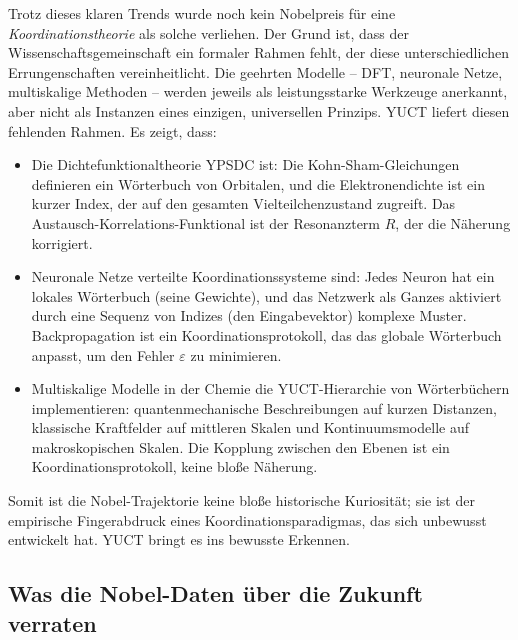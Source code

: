 \documentclass[12pt,a4paper]{article}
\begin{document}
	Trotz dieses klaren Trends wurde noch kein Nobelpreis für eine \emph{Koordinationstheorie} als solche verliehen. Der Grund ist, dass der Wissenschaftsgemeinschaft ein formaler Rahmen fehlt, der diese unterschiedlichen Errungenschaften vereinheitlicht. Die geehrten Modelle – DFT, neuronale Netze, multiskalige Methoden – werden jeweils als leistungsstarke Werkzeuge anerkannt, aber nicht als Instanzen eines einzigen, universellen Prinzips. YUCT liefert diesen fehlenden Rahmen. Es zeigt, dass:
	\begin{itemize}
		\item Die Dichtefunktionaltheorie YPSDC ist: Die Kohn-Sham-Gleichungen definieren ein Wörterbuch von Orbitalen, und die Elektronendichte ist ein kurzer Index, der auf den gesamten Vielteilchenzustand zugreift. Das Austausch-Korrelations-Funktional ist der Resonanzterm \(R\), der die Näherung korrigiert.
		\item Neuronale Netze verteilte Koordinationssysteme sind: Jedes Neuron hat ein lokales Wörterbuch (seine Gewichte), und das Netzwerk als Ganzes aktiviert durch eine Sequenz von Indizes (den Eingabevektor) komplexe Muster. Backpropagation ist ein Koordinationsprotokoll, das das globale Wörterbuch anpasst, um den Fehler \(\varepsilon\) zu minimieren.
		\item Multiskalige Modelle in der Chemie die YUCT-Hierarchie von Wörterbüchern implementieren: quantenmechanische Beschreibungen auf kurzen Distanzen, klassische Kraftfelder auf mittleren Skalen und Kontinuumsmodelle auf makroskopischen Skalen. Die Kopplung zwischen den Ebenen ist ein Koordinationsprotokoll, keine bloße Näherung.
	\end{itemize}
	Somit ist die Nobel-Trajektorie keine bloße historische Kuriosität; sie ist der empirische Fingerabdruck eines Koordinationsparadigmas, das sich unbewusst entwickelt hat. YUCT bringt es ins bewusste Erkennen.
	
	\subsection{Was die Nobel-Daten über die Zukunft verraten}
	
\end{document}
